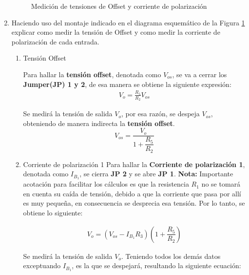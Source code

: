 \begin{enumerate}[label=\textbf{\arabic*.}, font=\bfseries]
    \begin{figure}[H]
      \centering
      \setcounter{figure}{22}
      
      \caption{Medición de tensiones de Offset y corriente de polarización}
      \label{fig:amp_op_real}
    \end{figure}
    
    \item Haciendo uso del montaje indicado en el diagrama esquemático de la Figura \ref{fig:amp_op_real} explicar como medir la tensión de Offset y como medir la corriente de polarización de cada entrada.

    \begin{enumerate}
        \item Tensión Offset
        
            Para hallar la \textbf{tensión offset}, denotada como $V_{os}$, se va a cerrar los \textbf{Jumper(JP) 1 y 2}, de esa manera se obtiene la siguiente expresión:
            \begin{align*}
                V_{o} = \frac{R_{5}}{R_{2}}V_{os}    
            \end{align*}
        
            Se medirá la tensión de salida $V_o$, por esa razón, se despeja $V_{os}$, obteniendo de manera indirecta la \textbf{tensión offset}.
            \begin{equation}
                V_{os}=\dfrac{V_o}{1+\dfrac{R_5}{R_2}}
                \label{eqn:vos}
            \end{equation}

        \item Corriente de polarización 1
            Para hallar la \textbf{Corriente de polarización 1}, denotada como $I_{B_1}$, se cierra \textbf{JP 2} y se abre \textbf{JP 1}.
            \textbf{Nota:} Importante acotación para facilitar los cálculos es que la resistencia $R_1$ no se tomará en cuenta su caída de tensión, debido a que la corriente que pasa por allí es muy pequeña, en consecuencia se desprecia esa tensión. Por lo tanto, se obtiene lo siguiente:

            \begin{align*}
                V_{o} = (V_{os}-I_{B_1}R_3)\left(1+\dfrac{R_5}{R_2}\right)      
            \end{align*}

            Se medirá la tensión de salida $V_o$. Teniendo todos los demás datos exceptuando $I_{B_1}$, es la que se despejará, resultando la siguiente ecuación:


\end{enumerate}
\end{enumerate}
